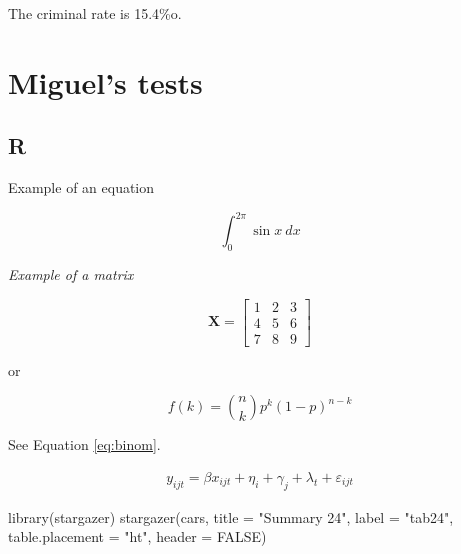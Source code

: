 \documentclass[
  12pt,
]{article}
\newenvironment{Shaded}{\begin{snugshade}}{\end{snugshade}}
\newcommand{\AttributeTok}[1]{\textcolor[rgb]{0.77,0.63,0.00}{#1}}
\newcommand{\CommentTok}[1]{\textcolor[rgb]{0.56,0.35,0.01}{\textit{#1}}}
\newcommand{\ConstantTok}[1]{\textcolor[rgb]{0.00,0.00,0.00}{#1}}
\newcommand{\FunctionTok}[1]{\textcolor[rgb]{0.00,0.00,0.00}{#1}}
\newcommand{\NormalTok}[1]{#1}
\newcommand{\OtherTok}[1]{\textcolor[rgb]{0.56,0.35,0.01}{#1}}
\newcommand{\SpecialCharTok}[1]{\textcolor[rgb]{0.00,0.00,0.00}{#1}}
\newcommand{\StringTok}[1]{\textcolor[rgb]{0.31,0.60,0.02}{#1}}
\begin{document}
\begin{Shaded}
\end{Shaded}

The criminal rate is 15.4\%o.

\vspace{0.3cm}

\hypertarget{miguels-tests}{%
\section{Miguel's tests}\label{miguels-tests}}

\hypertarget{r}{%
\subsection{R}\label{r}}

Example of an equation

\[\int_0^{2\pi} \sin x~dx\]

\emph{Example of a matrix}

\[
\mathbf{X} = \left[\begin{array}
{rrr}
1 & 2 & 3 \\
4 & 5 & 6 \\
7 & 8 & 9
\end{array}\right]
\]

or

\begin{equation}
f\left(k\right) = \binom{n}{k}p^k\left(1-p\right)^{n-k} \label{eq:binom}
\end{equation}

See Equation \eqref{eq:binom}.

\begin{align}
y_{ijt} = \beta x_{ijt} + \eta_i + \gamma_j + \lambda_t + \varepsilon_{ijt}
\end{align}

\begin{Shaded}
\begin{Highlighting}[]
\FunctionTok{library}\NormalTok{(stargazer)}
\FunctionTok{stargazer}\NormalTok{(cars,}
          \AttributeTok{title =} \StringTok{"Summary 24"}\NormalTok{,}
          \AttributeTok{label =} \StringTok{"tab24"}\NormalTok{,}
          \AttributeTok{table.placement =} \StringTok{"ht"}\NormalTok{,}
          \AttributeTok{header =} \ConstantTok{FALSE}\NormalTok{)}
\end{Highlighting}
\end{Shaded}
\end{document}
